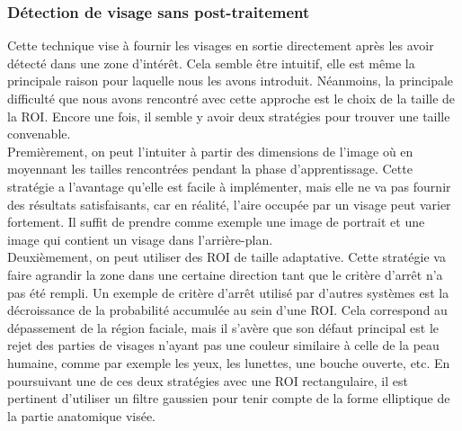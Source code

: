 \documentclass[a4paper,11pt]{article}
\begin{document}
\subsubsection{Détection de visage sans post-traitement}
Cette technique vise à fournir les visages en sortie directement après les avoir détecté dans une zone d'intérêt.
Cela semble être intuitif, elle est même la principale raison pour laquelle nous les avons introduit.
Néanmoins, la principale difficulté que nous avons rencontré avec cette approche est le choix de la taille de la ROI.
Encore une fois, il semble y avoir deux stratégies pour trouver une taille convenable.\\
\newline
Premièrement, on peut l'intuiter à partir des dimensions de l'image où en moyennant les tailles rencontrées pendant la phase d'apprentissage.
Cette stratégie a l'avantage qu'elle est facile à implémenter, mais elle ne va pas fournir des résultats satisfaisants, car en réalité, l'aire occupée par un visage peut varier fortement.
Il suffit de prendre comme exemple une image de portrait et une image qui contient un visage dans l'arrière-plan.\\
\newline
Deuxièmement, on peut utiliser des ROI de taille adaptative. 
Cette stratégie va faire agrandir la zone dans une certaine direction tant que le critère d'arrêt n'a pas été rempli.
Un exemple de critère d'arrêt utilisé par d'autres systèmes est la décroissance de la probabilité accumulée au sein d'une ROI.
Cela correspond au dépassement de la région faciale, mais il s'avère que son défaut principal est le rejet des parties de visages n'ayant pas une couleur similaire à celle de la peau humaine, comme par exemple les yeux, les lunettes, une bouche ouverte, etc.
\newline
\newline
En poursuivant une de ces deux stratégies avec une ROI rectangulaire, il est
pertinent d'utiliser un filtre gaussien pour tenir compte de la forme elliptique
de la partie anatomique visée.
\end{document}
